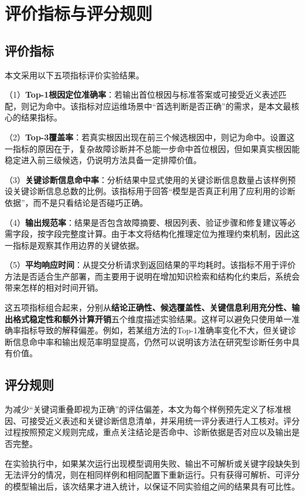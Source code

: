 \section{评价指标与评分规则}

\subsection{评价指标}

本文采用以下五项指标评价实验结果。

（1）\textbf{Top-1根因定位准确率}：若输出首位根因与标准答案或可接受近义表述匹配，则记为命中。该指标对应运维场景中“首选判断是否正确”的需求，是本文最核心的结果指标。

（2）\textbf{Top-3覆盖率}：若真实根因出现在前三个候选根因中，则记为命中。设置这一指标的原因在于，复杂故障诊断并不总能一步命中首位根因，但如果真实根因能稳定进入前三级候选，仍说明方法具备一定排障价值。

（3）\textbf{关键诊断信息命中率}：分析结果中显式使用的关键诊断信息数量占该样例预设关键诊断信息总数的比例。该指标用于回答“模型是否真正利用了应利用的诊断依据”，而不是只看结论是否碰巧正确。

（4）\textbf{输出规范率}：结果是否包含故障摘要、根因列表、验证步骤和修复建议等必需字段，按字段完整度计算。由于本文将结构化推理定位为推理约束机制，因此这一指标是观察其作用边界的关键依据。

（5）\textbf{平均响应时间}：从提交分析请求到返回结果的平均耗时。该指标不用于评价方法是否适合生产部署，而主要用于说明在增加知识检索和结构化约束后，系统会带来怎样的相对时间开销。

这五项指标组合起来，分别从\textbf{结论正确性、候选覆盖性、关键信息利用充分性、输出格式稳定性和额外计算开销}五个维度描述实验结果。这样可以避免只使用单一准确率指标导致的解释偏差。例如，若某组方法的Top-1准确率变化不大，但关键诊断信息命中率和输出规范率明显提高，仍然可以说明该方法在研究型诊断任务中具有价值。

\subsection{评分规则}

为减少“关键词重叠即视为正确”的评估偏差，本文为每个样例预先定义了标准根因、可接受近义表述和关键诊断信息清单，并采用统一评分表进行人工核对。评分过程按照预定义规则完成，重点关注结论是否命中、诊断依据是否对应以及输出是否完整。

在实验执行中，如果某次运行出现模型调用失败、输出不可解析或关键字段缺失到无法评分的情况，则在相同样例和相同配置下重新运行。只有获得可解析、可评分的模型输出后，该次结果才进入统计，以保证不同实验组之间的结果具有可比性。

